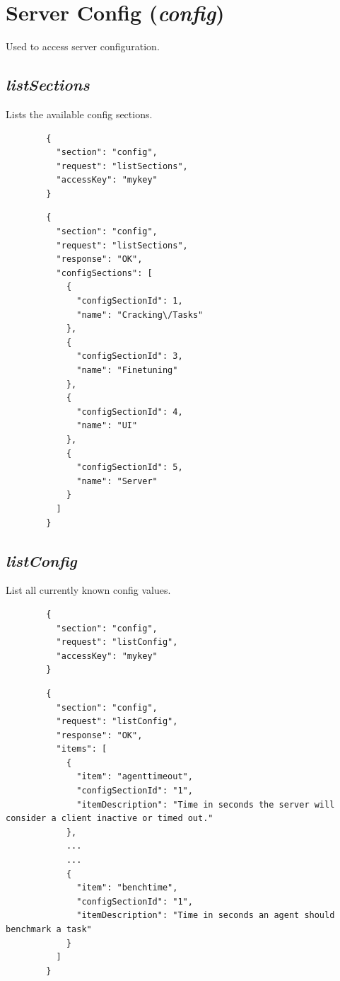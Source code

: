 \section*{Server Config (\textit{config})}
	Used to access server configuration.

\subsection*{\textit{listSections}}
	Lists the available config sections.
	{
		\color{blue}
		\begin{verbatim}
		{
		  "section": "config",
		  "request": "listSections",
		  "accessKey": "mykey"
		}
		\end{verbatim}
	}
	{
		\color{OliveGreen}
		\begin{verbatim}
		{
		  "section": "config",
		  "request": "listSections",
		  "response": "OK",
		  "configSections": [
		    {
		      "configSectionId": 1,
		      "name": "Cracking\/Tasks"
		    },
		    {
		      "configSectionId": 3,
		      "name": "Finetuning"
		    },
		    {
		      "configSectionId": 4,
		      "name": "UI"
		    },
		    {
		      "configSectionId": 5,
		      "name": "Server"
		    }
		  ]
		}
		\end{verbatim}
	}
\subsection*{\textit{listConfig}}
	List all currently known config values.
	{
		\color{blue}
		\begin{verbatim}
		{
		  "section": "config",
		  "request": "listConfig",
		  "accessKey": "mykey"
		}
		\end{verbatim}
	}
	{
		\color{OliveGreen}
		\begin{verbatim}
		{
		  "section": "config",
		  "request": "listConfig",
		  "response": "OK",
		  "items": [
		    {
		      "item": "agenttimeout",
		      "configSectionId": "1",
		      "itemDescription": "Time in seconds the server will consider a client inactive or timed out."
		    },
            ...
            ...
		    {
		      "item": "benchtime",
		      "configSectionId": "1",
		      "itemDescription": "Time in seconds an agent should benchmark a task"
		    }
		  ]
		}
		\end{verbatim}
	}
